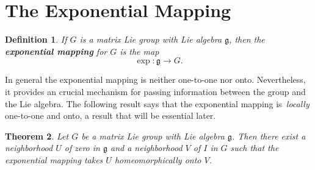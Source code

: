 \documentclass{amsbook}
\let \frak = \mathfrak
\theoremstyle{plain}
\newtheorem{theorem}{Theorem}
\newtheorem{definition}[theorem]{Definition}
\numberwithin{equation}{chapter}
\numberwithin{theorem}{chapter}
\begin{document}
\section{The Exponential Mapping\label{exponential.mapping}}

\begin{definition}
If $G$ is a matrix Lie group with Lie algebra $\frak{g}$, then the
\textbf{exponential mapping} for $G$ is the map
\[
\exp:\frak{g}\rightarrow G\text{.}%
\]
\end{definition}

In general the exponential mapping is neither one-to-one nor onto.
Nevertheless, it provides an crucial mechanism for passing information between
the group and the Lie algebra. The following result says that the exponential
mapping is\textit{\ locally} one-to-one and onto, a result that will be
essential later.

\begin{theorem}
\label{local.log}Let $G$ be a matrix Lie group with Lie algebra $\frak{g}$.
Then there exist a neighborhood $U$ of zero in $\frak{g}$ and a neighborhood
$V$ of $I$ in $G$ such that the exponential mapping takes $U$ homeomorphically
onto $V$.
\end{theorem}
\end{document}
